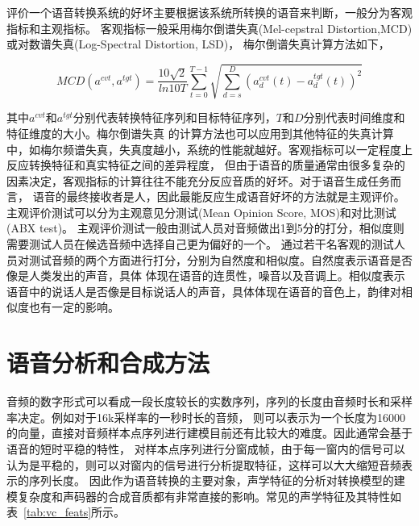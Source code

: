 评价一个语音转换系统的好坏主要根据该系统所转换的语音来判断，一般分为客观指标和主观指标。
客观指标一般采用梅尔倒谱失真(Mel-cepstral Distortion,MCD)或对数谱失真(Log-Spectral Distortion, LSD)，
梅尔倒谱失真计算方法如下，

$$MCD(a^{cvt}, a^{tgt})=\frac{10\sqrt{2}}{ln10T}\sum^{T-1}_{t=0}\sqrt{\sum^{D}_{d=s}(a^{cvt}_{d}(t)-a^{tgt}_{d}(t))^2}$$

其中$a^{cvt}$和$a^{tgt}$分别代表转换特征序列和目标特征序列，$T$和$D$分别代表时间维度和特征维度的大小。梅尔倒谱失真
的计算方法也可以应用到其他特征的失真计算中，如梅尔频谱失真，失真度越小，系统的性能就越好。客观指标可以一定程度上反应转换特征和真实特征之间的差异程度，
但由于语音的质量通常由很多复杂的因素决定，客观指标的计算往往不能充分反应音质的好坏。对于语音生成任务而言，
语音的最终接收者是人，因此最能反应生成语音好坏的方法就是主观评价。主观评价测试可以分为主观意见分测试(Mean Opinion Score, MOS)和对比测试(ABX test)。
主观评价测试一般由测试人员对音频做出1到5分的打分，相似度则需要测试人员在候选音频中选择自己更为偏好的一个。
通过若干名客观的测试人员对测试音频的两个方面进行打分，分别为自然度和相似度。自然度表示语音是否像是人类发出的声音，具体
体现在语音的连贯性，噪音以及音调上。相似度表示语音中的说话人是否像是目标说话人的声音，具体体现在语音的音色上，韵律对相似度也有一定的影响。


\section{语音分析和合成方法}
音频的数字形式可以看成一段长度较长的实数序列，序列的长度由音频时长和采样率决定。例如对于16k采样率的一秒时长的音频，
则可以表示为一个长度为16000的向量，直接对音频样本点序列进行建模目前还有比较大的难度。因此通常会基于语音的短时平稳的特性，
对样本点序列进行分窗成帧，由于每一窗内的信号可以认为是平稳的，则可以对窗内的信号进行分析提取特征，这样可以大大缩短音频表示的序列长度。
因此作为语音转换的主要对象，声学特征的分析对转换模型的建模复杂度和声码器的合成音质都有非常直接的影响。常见的声学特征及其特性如表~\ref{tab:vc_feats}所示\cite{Nurminen2012Voice}。

